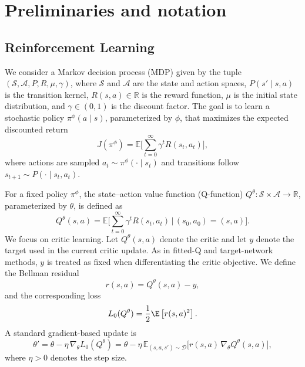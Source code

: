 \section{Preliminaries and notation}
\label{sec:prelim}
\subsection{Reinforcement Learning}
We consider a Markov decision process (MDP) given by the tuple $(\mathcal{S},\mathcal{A},P,R,\mu,\gamma)$, where $\mathcal{S}$ and $\mathcal{A}$ are the state and action spaces, $P(s'\mid s,a)$ is the transition kernel, $R(s,a)\in\mathbb{R}$ is the reward function, $\mu$ is the initial state distribution, and $\gamma\in(0,1)$ is the discount factor. The goal is to learn a stochastic policy $\pi^\phi(a\mid s)$, parameterized by $\phi$, that maximizes the expected discounted return
\begin{equation}
J(\pi^\phi)=\mathbb{E}\Big[\sum_{t=0}^{\infty}\gamma^t R(s_t,a_t)\Big],
\end{equation}
where actions are sampled $a_t\sim\pi^\phi(\cdot\mid s_t)$ and transitions follow $s_{t+1}\sim P(\cdot\mid s_t,a_t)$.

For a fixed policy $\pi^\phi$, the state–action value function (Q-function) $Q^\theta:\mathcal{S}\times\mathcal{A}\to\mathbb{R}$, parameterized by $\theta$, is defined as
\begin{equation}
Q^{\theta}(s,a)=\mathbb{E}\Big[\sum_{t=0}^{\infty}\gamma^t R(s_t,a_t)\,\Big|\, (s_0,a_0)=(s,a)\Big].
\end{equation}
We focus on critic learning. Let $Q^\theta(s,a)$ denote the critic and let $y$ denote the target used in the current critic update. As in fitted-Q and target-network methods, $y$ is treated as fixed when differentiating
the critic objective. We define the Bellman residual
\begin{equation}
r(s,a)
=
Q^\theta(s,a)-y,
\end{equation}
and the corresponding loss
\begin{equation}
L_0(Q^\theta)
=
\frac{1}{2}
\E\left[
r(s,a)^2
\right].
\label{eq:bellman_loss}
\end{equation}
A standard gradient-based update is
\begin{equation}\label{eq:theta-update-mse}
\theta'=\theta-\eta\,\nabla_\theta L_0(Q^\theta)
=\theta-\eta\,\mathbb{E}_{(s,a,s')\sim\mathcal{D}}\big[r(s,a)\,\nabla_\theta Q^\theta(s,a)\big],
\end{equation}
where $\eta>0$ denotes the step size.

